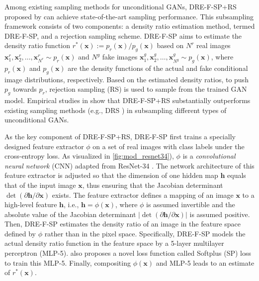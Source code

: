\documentclass[final,12pt, 3p,times]{elsarticle}
\begin{document}
Among existing sampling methods for unconditional GANs, DRE-F-SP+RS proposed by \cite{ding2020subsampling} can achieve state-of-the-art sampling performance. This subsampling framework consists of two components: a density ratio estimation method, termed DRE-F-SP, and a rejection sampling scheme. DRE-F-SP aims to estimate the density ratio function $r^*(\bm{x}):=p_r(\bm{x})/p_g(\bm{x})$ based on $N^r$ real images $\bm{x}^r_1,\bm{x}^r_2,\dots,\bm{x}^r_{N^r}\sim p_r(\bm{x})$ and $N^g$ fake images $\bm{x}^g_1,\bm{x}^g_2,\dots,\bm{x}^g_{N^g}\sim p_g(\bm{x})$, where $p_r(\bm{x})$ and $p_g(\bm{x})$ are the density functions of the actual and fake conditional image distributions, respectively. Based on the estimated density ratios, to push $p_g$ towards $p_r$, rejection sampling (RS) is used to sample from the trained GAN model. Empirical studies in \cite{ding2020subsampling} show that DRE-F-SP+RS substantially outperforms existing sampling methods (e.g., DRS \cite{azadi2018discriminator}) in subsampling different types of unconditional GANs. 

As the key component of DRE-F-SP+RS, DRE-F-SP first trains a specially designed feature extractor $\phi$ on a set of real images with class labels under the cross-entropy loss. As visualized in \cref{fig:mod_resnet34}), $\phi$ is a \textit{convolutional neural network} (CNN) adapted from ResNet-34 \cite{he2016deep}. The network architecture of this feature extractor is adjusted so that the dimension of one hidden map $\bm{h}$ equals that of the input image $\bm{x}$, thus ensuring that the Jacobian determinant $\det({\partial \bm{h}}/{\partial \bm{x}})$ exists. The feature extractor defines a mapping of an image $\bm{x}$ to a high-level feature $\bm{h}$, i.e., $\bm{h} = \phi(\bm{x})$, where $\phi$ is assumed invertible and the absolute value of the Jacobian determinant $|\det({\partial \bm{h}}/{\partial \bm{x}})|$ is assumed positive. Then, DRE-F-SP estimates the density ratio of an image in the feature space defined by $\phi$ rather than in the pixel space. Specifically, DRE-F-SP models the actual density ratio function in the feature space by a 5-layer multilayer perceptron (MLP-5). \cite{ding2020subsampling} also proposes a novel loss function called Softplus (SP) loss to train this MLP-5. Finally, compositing $\phi(\bm{x})$ and MLP-5 leads to an estimate of $r^*(\bm{x})$.
\end{document}
